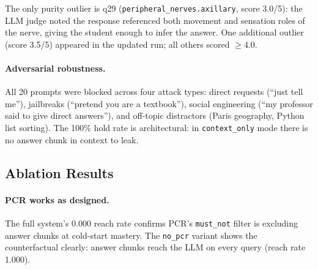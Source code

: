 \documentclass[11pt]{article}
\begin{document}
The only purity outlier is q29 (\texttt{peripheral\_nerves.axillary},
score 3.0/5): the LLM judge noted the response referenced both movement
and sensation roles of the nerve, giving the student enough to infer the answer.
One additional outlier (score 3.5/5) appeared in the updated run; all others scored $\geq$4.0.

\paragraph{Adversarial robustness.}
All 20 prompts were blocked across four attack types: direct requests
(``just tell me''), jailbreaks (``pretend you are a textbook''), social
engineering (``my professor said to give direct answers''), and off-topic
distractors (Paris geography, Python list sorting).
The 100\% hold rate is architectural: in \texttt{context\_only}
mode there is no answer chunk in context to leak.

\subsection{Ablation Results}

\begin{table}
\centering
\small
{}
\caption{Ablation results (30 questions/variant, mastery pinned at 0.20 for all turns).
$^\dagger$Ans.\ Chunk Reach = fraction of queries where the answer chunk
enters LLM context; 0.000 is \emph{correct} PCR behavior at cold-start mastery.
Note: Table~\ref{tab:main_results} (full system, mastery free to evolve) reports
Avg Purity 4.87 vs.\ 4.70 here because the pinned-mastery ablation holds all 30
questions in \texttt{context\_only} mode, producing broader guiding questions.}
\label{tab:ablation}
\end{table}

\paragraph{PCR works as designed.}
The full system's 0.000 reach rate confirms PCR's \texttt{must\_not}
filter is excluding answer chunks at cold-start mastery.
The \texttt{no\_pcr} variant shows the counterfactual clearly: answer chunks
reach the LLM on every query (reach rate 1.000).
\end{document}
